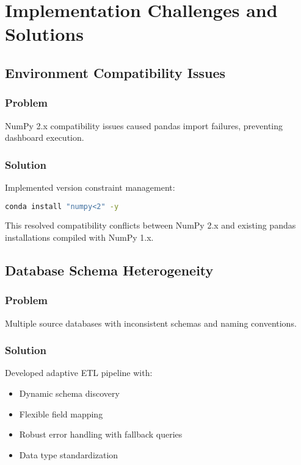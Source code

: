 \documentclass[12pt,a4paper]{article}
\begin{document}
\section{Implementation Challenges and Solutions}

\subsection{Environment Compatibility Issues}

\subsubsection{Problem}
NumPy 2.x compatibility issues caused pandas import failures, preventing dashboard execution.

\subsubsection{Solution}
Implemented version constraint management:
\begin{lstlisting}[language=bash]
conda install "numpy<2" -y
\end{lstlisting}

This resolved compatibility conflicts between NumPy 2.x and existing pandas installations compiled with NumPy 1.x.

\subsection{Database Schema Heterogeneity}

\subsubsection{Problem}
Multiple source databases with inconsistent schemas and naming conventions.

\subsubsection{Solution}
Developed adaptive ETL pipeline with:
\begin{itemize}
    \item Dynamic schema discovery
    \item Flexible field mapping
    \item Robust error handling with fallback queries
    \item Data type standardization
\end{itemize}
\end{document}
